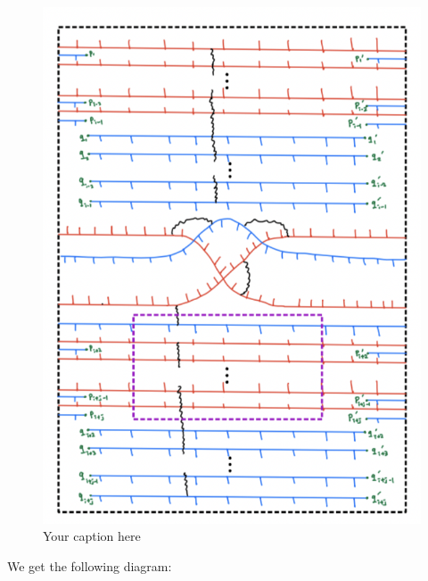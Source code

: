 \begin{figure}[H] %
    \centering
    \includegraphics[width=\linewidth]{diagrams/theorem12/9.png} %
    \caption{Your caption here}
    \label{fig:your-label}
\end{figure}

We get the following diagram:

